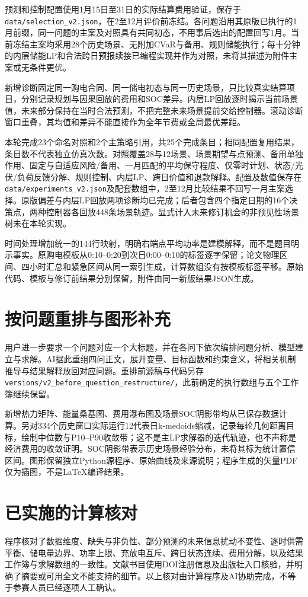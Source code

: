 \documentclass[UTF8,a4paper,11pt]{ctexart}
\begin{document}
预测和控制配置使用1月15日至31日的实际结算费用验证，保存于\texttt{data/selection\_v2.json}，在2至12月评价前冻结。各问题沿用其原版已执行的1月前缀，同一问题的主案及对照具有共同初态，不用事后选出的配置回写1月。当前冻结主案均采用28个历史场景、无附加CVaR与备用、规则储能执行；每十分钟的内层储能LP和合法跨日预报续接已编程实现并作为对照，未将其描述为附件主案或无条件更优。

新增诊断固定同一购电合同、同一储电初态与同一历史场景，只比较真实结算项目，分别记录规划与因果回放的费用和SOC差异。内层LP回放逐时揭示当前场景值，未来部分保持在当时合法预测，不把完整未来场景提前交给控制器。滚动诊断窗口重叠，其均值和差异不能直接作为全年节费或全局最优差距。

本轮完成23个命名对照和2个主策略引用，共25个完成条目；相同配置复用结果，条目数不代表独立仿真次数。对照覆盖28与12场景、场景期望与点预测、备用单独作用、固定与自适应风险/备用、一月匹配的平均保守程度、仅零时计划、状态/光伏/负荷反馈分解、规则控制、内层LP、跨日价值和退款解释。配置及数值保存在\texttt{data/experiments\_v2.json}及配套数组中，2至12月比较结果不回写一月主案选择。原版偏差与内层LP回放两项诊断均已完成；后者包含四个指定日期的16个决策点，两种控制器各回放448条场景轨迹。显式计入未来修订机会的非预见性场景树未在本轮实现。

时间处理增加统一的144行映射，明确右端点平均功率是建模解释，而不是题目明示事实。原购电模板从0:10--0:20到次日0:00--0:10的标签逐字保留；论文物理区间、四小时汇总和紧急区间从同一索引生成，计算数组没有按模板标签平移。原始代码、模板与修订前结果分别保留，附件由同一新版结果JSON生成。

\section{按问题重排与图形补充}

用户进一步要求一个问题对应一个大标题，并在各问下依次编排问题分析、模型建立与求解。AI据此重组四问正文，展开变量、目标函数和约束含义，将相关机制推导与结果解释放回对应问题。重排前源稿与代码另存\texttt{versions/v2\_before\_question\_restructure/}，此前确定的执行数组与五个工作簿继续保留。

新增热力矩阵、能量桑基图、费用瀑布图及场景SOC阴影带均从已保存数据计算。另对334个历史窗口实际运行12代表日k-medoids缩减，记录每轮几何距离目标，绘制中位数与P10--P90收敛带；这不是主LP求解器的迭代轨迹，也不声称是经济费用的收敛证明。SOC阴影带表示历史场景经验分布，未将其标为统计置信区间。图形保留独立Python源程序、原始曲线及来源说明；程序生成的矢量PDF仅为插图，不是LaTeX编译结果。

\section{已实施的计算核对}
程序核对了数据维度、缺失与非负性、部分预测的未来信息扰动不变性、逐时供需平衡、储电量边界、功率上限、充放电互斥、跨日状态连续、费用分解，以及结果工作簿与求解数组的一致性。文献书目使用DOI注册信息及出版社入口核验，并明确了摘要或可用全文不能支持的细节。以上核对由计算程序及AI协助完成，不等于参赛人员已经逐项人工确认。
\end{document}
